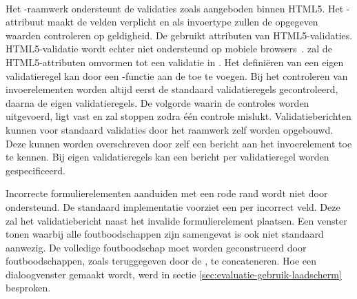 \paragraph{\kendo}
Het \kendo{}-raamwerk ondersteunt de validaties zoals aangeboden binnen HTML5.
Het -attribuut maakt de velden verplicht  en  als invoertype zullen de opgegeven waarden controleren op geldigheid.
De \kendo{}  gebruikt attributen van HTML5-validaties.
HTML5-validatie wordt echter niet ondersteund op mobiele browsers~\cite{Deveria2013c}. 
\kendo{} zal de HTML5-attributen omvormen tot een validatie in \js{}. 
Het definiëren van een eigen validatieregel kan door een \js-functie aan de  toe te voegen.
Bij het controleren van invoerelementen worden altijd eerst de standaard validatieregels gecontroleerd,  daarna de eigen validatieregels.
De volgorde waarin de controles worden uitgevoerd, ligt vast en zal stoppen zodra één controle mislukt.
Validatieberichten kunnen voor standaard validaties door het raamwerk zelf worden opgebouwd.
Deze kunnen worden overschreven door zelf een bericht aan het invoerelement toe te kennen.
Bij eigen validatieregels kan een bericht per validatieregel worden gespecificeerd.

Incorrecte formulierelementen aanduiden met een rode rand wordt niet door \kendo{} ondersteund.
De standaard implementatie voorziet een  per incorrect veld.
Deze zal het validatiebericht naast het invalide formulierelement plaatsen. 
Een venster tonen waarbij alle foutboodschappen zijn samengevat is ook niet standaard aanwezig.
De volledige foutboodschap moet worden geconstrueerd door foutboodschappen,  zoals teruggegeven door de , te concateneren.
Hoe een dialoogvenster gemaakt wordt, werd in sectie \ref{sec:evaluatie-gebruik-laadscherm} besproken.

